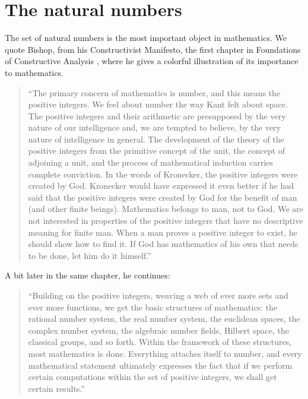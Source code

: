 \section{The natural numbers}


The set of natural numbers is the most important object in mathematics. We quote Bishop, from his Constructivist Manifesto, the first chapter in Foundations of Constructive Analysis \cite{Bishop1967}, where he gives a colorful illustration of its importance to mathematics.

\begin{quote}
  ``The primary concern of mathematics is number, and this means the positive integers. We feel about number the way Kant felt about space. The positive integers and their arithmetic are presupposed by the very nature of our intelligence and, we are tempted to believe, by the very nature of intelligence in general. The development of the theory of the positive integers from the primitive concept of the unit, the concept of adjoining a unit, and the process of mathematical induction carries complete conviction. In the words of Kronecker, the positive integers were created by God. Kronecker would have expressed it even better if he had said that the positive integers were created by God for the benefit of man (and other finite beings). Mathematics belongs to man, not to God. We are not interested in properties of the positive integers that have no descriptive meaning for finite man. When a man proves a positive integer to exist, he should show how to find it. If God has mathematics of his own that needs to be done, let him do it himself.''
\end{quote}

A bit later in the same chapter, he continues:

\begin{quote}
  ``Building on the positive integers, weaving a web of ever more sets and ever more functions, we get the basic structures of mathematics: the rational number system, the real number system, the euclidean spaces, the complex number system, the algebraic number fields, Hilbert space, the classical groups, and so forth. Within the framework of these structures, most mathematics is done. Everything attaches itself to number, and every mathematical statement ultimately expresses the fact that if we perform certain computations within the set of positive integers, we shall get certain results.''
\end{quote}

